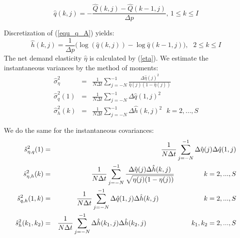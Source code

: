 \documentclass{article}
\begin{document}
\begin{equation*}
\hat{q}(k,j)=-\frac{\hat{Q}(k,j)-\hat{Q}(k-1,j)}{\Delta p}\text{, \ \ \ \ \ }%
1\leq k\leq I
\end{equation*}

Discretization of (\ref{equ_q_A}) yields:%
\begin{equation*}
\hat{h}(k,j)=\frac{1}{\Delta p}(\log (\hat{q}(k,j))-\log {\hat{q}(k-1,j)),}%
\text{ \ \ \ \ \ }2\leq k\leq I
\end{equation*}%
The net demand elasticity $\hat{\eta}$ is calculated by (\ref{eta}). We
estimate the instantaneous variances by the method of moments:
\begin{eqnarray*}
\hat{\sigma}_{\eta }^{2} &=&\frac{1}{N\Delta t}\sum_{j=-N}^{-1}\frac{\Delta
\hat{\eta}(j)^{2}}{\hat{\eta}(j)(1-\hat{\eta}(j))} \\
\hat{\sigma}_{q}^{2}(1) &=&\frac{1}{N\Delta t}\sum_{j=-N}^{-1}\Delta \hat{q}%
(1,j)^{2} \\
\hat{\sigma}_{h}^{2}(k) &=&\frac{1}{N\Delta t}\sum_{j=-N}^{-1}\Delta \hat{h}%
(k,j)^{2}\text{\ \ \ \ \ \ \ \ \ \ }k=2,...,S
\end{eqnarray*}

We do the same for the instantaneous covariances:%
\begin{eqnarray*}
\hat{s}_{\eta ,q}^{2}(1) &=&\frac{1}{N\Delta t}\sum_{j=-N}^{-1}\Delta \hat{%
\eta}(j)\Delta \hat{q}(1,j) \\
\hat{s}_{\eta ,h}^{2}(k) &=&\frac{1}{N\Delta t}\sum_{j=-N}^{-1}\frac{\Delta
\hat{\eta}(j)\Delta \hat{h}(k,j)}{\sqrt{\eta (j)(1-\eta (j))}}\text{ \ \ \ \
\ \ \ \ \ \ }k=2,...,S \\
\hat{s}_{q,h}^{2}(1,k) &=&\frac{1}{N\Delta t}\sum_{j=-N}^{-1}\Delta \hat{q}%
(1,j)\Delta \hat{h}(k,j)\text{ \ \ \ \ \ \ \ \ \ \ \ \ \ \ \ \ \ }k=2,...,S
\\
\hat{s}_{h}^{2}(k_{1},k_{2}) &=&\frac{1}{N\Delta t}\sum_{j=-N}^{-1}\Delta
\hat{h}(k_{1},j)\Delta \hat{h}(k_{2},j)\text{ \ \ \ \ \ \ \ \ \ \ \ \ \ \ \
\ \ }k_{1},k_{2}=2,...,S
\end{eqnarray*}
\end{document}
